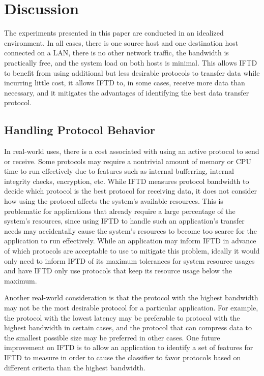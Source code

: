 \section{Discussion}

The experiments presented in this paper are conducted in an idealized environment.  In all cases, there is one source host and one destination host connected on a LAN, there is no other network traffic, the bandwidth is practically free, and the system load on both hosts is minimal.  This allows IFTD to benefit from using additional but less desirable protocols to transfer data while incurring little cost, it allows IFTD to, in some cases, receive more data than necessary, and it mitigates the advantages of identifying the best data transfer protocol.

\subsection{Handling Protocol Behavior}

In real-world uses, there is a cost associated with using an active protocol to send or receive.  Some protocols may require a nontrivial amount of memory or CPU time to run effectively due to features such as internal bufferring, internal integrity checks, encryption, etc.  While IFTD measures protocol bandwidth to decide which protocol is the best protocol for receiving data, it does not consider how using the protocol affects the system's available resources.  This is problematic for applications that already require a large percentage of the system's resources, since using IFTD to handle such an application's transfer needs may accidentally cause the system's resources to become too scarce for the application to run effectively.  While an application may inform IFTD in advance of which protocols are acceptable to use to mitigate this problem, ideally it would only need to inform IFTD of its maximum tolerances for system resource usages and have IFTD only use protocols that keep its resource usage below the maximum.

Another real-world consideration is that the protocol with the highest bandwidth may not be the most desirable protocol for a particular application.  For example, the protocol with the lowest latency may be preferable to protocol with the highest bandwidth in certain cases, and the protocol that can compress data to the smallest possible size may be preferred in other cases.  One future improvement on IFTD is to allow an application to identify a set of features for IFTD to measure in order to cause the classifier to favor protocols based on different criteria than the highest bandwidth.

